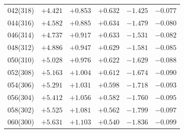 \begin{table}[!h]
\begin{tabular}{crrrrr}
042(318) & $+4.421$ & $+0.853$ & $+0.632$ & $-1.425$ & $-0.077$ \\ 
044(316) & $+4.582$ & $+0.885$ & $+0.634$ & $-1.479$ & $-0.080$ \\ 
046(314) & $+4.737$ & $+0.917$ & $+0.633$ & $-1.531$ & $-0.082$ \\ 
048(312) & $+4.886$ & $+0.947$ & $+0.629$ & $-1.581$ & $-0.085$ \\ 
050(310) & $+5.028$ & $+0.976$ & $+0.622$ & $-1.629$ & $-0.088$ \\ 
052(308) & $+5.163$ & $+1.004$ & $+0.612$ & $-1.674$ & $-0.090$ \\ 
054(306) & $+5.291$ & $+1.031$ & $+0.598$ & $-1.718$ & $-0.093$ \\ 
056(304) & $+5.412$ & $+1.056$ & $+0.582$ & $-1.760$ & $-0.095$ \\
058(302) & $+5.525$ & $+1.081$ & $+0.562$ & $-1.799$ & $-0.097$ \\ 
060(300) & $+5.631$ & $+1.103$ & $+0.540$ & $-1.836$ & $-0.099$ \\ 
\end{tabular}
\end{table}

